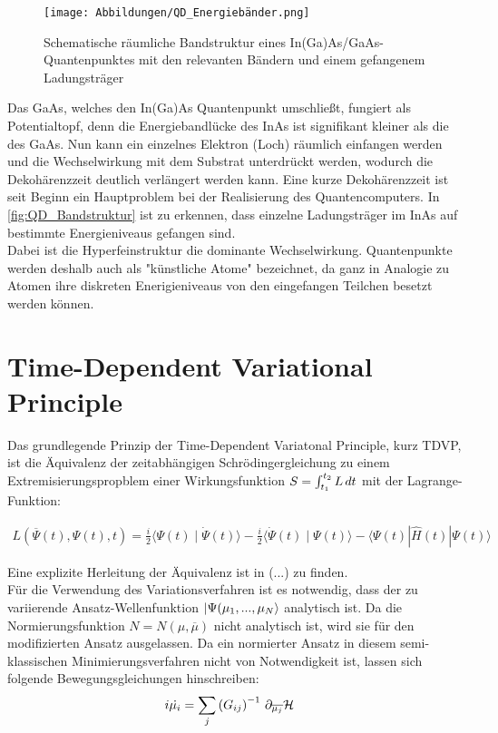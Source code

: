 \documentclass[12pt]{article}
\def\muk{\overline{\mu}}
\begin{document}
\begin{figure}
   \centering
    \texttt{[image: Abbildungen/QD\_Energiebänder.png]}
    \caption{Schematische räumliche Bandstruktur eines In(Ga)As/GaAs-Quantenpunktes mit den relevanten Bändern und einem 
    gefangenem Ladungsträger}
    \label{fig:QD_Bandstruktur}
\end{figure}
\noindent Das GaAs, welches den In(Ga)As Quantenpunkt umschließt, fungiert als Potentialtopf, denn die Energiebandlücke des InAs ist 
signifikant kleiner als die des GaAs. Nun kann ein einzelnes Elektron (Loch) räumlich einfangen werden und die Wechselwirkung mit dem 
Substrat unterdrückt werden, wodurch die Dekohärenzzeit deutlich verlängert werden kann. Eine kurze Dekohärenzzeit ist seit Beginn ein 
Hauptproblem bei der Realisierung des Quantencomputers. In \autoref{fig:QD_Bandstruktur} ist zu erkennen, dass einzelne Ladungsträger 
im InAs auf bestimmte Energieniveaus gefangen sind.\\
Dabei ist die Hyperfeinstruktur die dominante Wechselwirkung. Quantenpunkte werden deshalb auch als "künstliche Atome" bezeichnet,
 da ganz in Analogie zu Atomen ihre diskreten Enerigieniveaus von den eingefangen Teilchen besetzt werden können.









\newpage
\section{Time-Dependent Variational Principle }

Das grundlegende Prinzip der Time-Dependent Variatonal Principle, kurz TDVP, ist die Äquivalenz der zeitabhängigen Schrödingergleichung
 zu einem Extremisierungspropblem einer Wirkungsfunktion $S=\int_{t_1}^{t_2}L \thinspace dt$ mit der Lagrange-Funktion:

\begin{align}
    L\left(\overline{\Psi}(t), \Psi(t), t\right)=\frac{i}{2}\langle\Psi(t) \mid \dot{\Psi}(t)\rangle-\frac{i}{2}\langle\dot{\Psi}(t) \mid \Psi(t)\rangle-\langle\Psi(t)|\hat{H}(t)| \Psi(t)\rangle
\end{align}

Eine explizite Herleitung der Äquivalenz ist in (...) zu finden. \\

\noindent Für die Verwendung des Variationsverfahren ist es notwendig, dass der zu variierende Ansatz-Wellenfunktion 
$\ket{\Psi(\mu_1,...,\mu_N}$ analytisch ist. Da die Normierungsfunktion $N=N(\mu,\muk)$ nicht analytisch ist, wird sie 
für den modifizierten Ansatz ausgelassen. Da ein normierter Ansatz in diesem semi-klassischen Minimierungsverfahren nicht 
von Notwendigkeit ist, lassen sich folgende Bewegungsgleichungen hinschreiben:
\begin{align}
    i\dot{\mu_i} &= \sum_{j}\left(G_{ij}\right)^{-1}\thinspace \partial_{\overline{\mu_j}}\mathcal{H}
\end{align}
\end{document}
